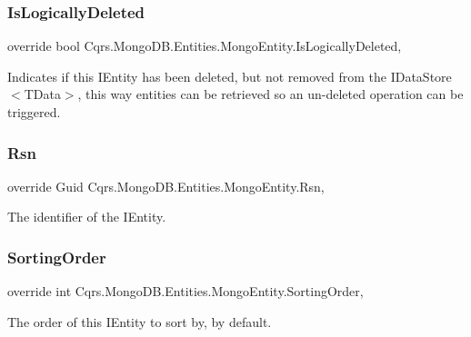 \subsubsection{\texorpdfstring{Is\+Logically\+Deleted}{IsLogicallyDeleted}}
{\footnotesize\ttfamily override bool Cqrs.\+Mongo\+D\+B.\+Entities.\+Mongo\+Entity.\+Is\+Logically\+Deleted\hspace{0.3cm}{\ttfamily [get]}, {\ttfamily [set]}}



Indicates if this I\+Entity has been deleted, but not removed from the I\+Data\+Store$<$\+T\+Data$>$, this way entities can be retrieved so an un-\/deleted operation can be triggered. 

\mbox{\label{classCqrs_1_1MongoDB_1_1Entities_1_1MongoEntity_acc0c0c4d927e9abfe88415cababff6b5_acc0c0c4d927e9abfe88415cababff6b5}} 
\subsubsection{\texorpdfstring{Rsn}{Rsn}}
{\footnotesize\ttfamily override Guid Cqrs.\+Mongo\+D\+B.\+Entities.\+Mongo\+Entity.\+Rsn\hspace{0.3cm}{\ttfamily [get]}, {\ttfamily [set]}}



The identifier of the I\+Entity. 

\mbox{\label{classCqrs_1_1MongoDB_1_1Entities_1_1MongoEntity_a3d5f7476fc2de3b9061ea3e76e77e0cb_a3d5f7476fc2de3b9061ea3e76e77e0cb}} 
\subsubsection{\texorpdfstring{Sorting\+Order}{SortingOrder}}
{\footnotesize\ttfamily override int Cqrs.\+Mongo\+D\+B.\+Entities.\+Mongo\+Entity.\+Sorting\+Order\hspace{0.3cm}{\ttfamily [get]}, {\ttfamily [set]}}



The order of this I\+Entity to sort by, by default. 

